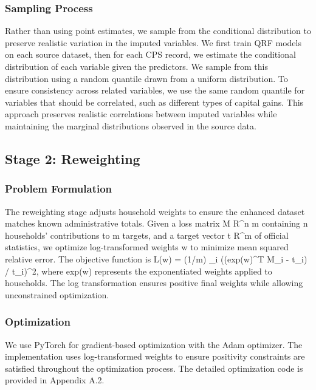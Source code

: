 \subsubsection{Sampling Process}

Rather than using point estimates, we sample from the conditional distribution to preserve realistic variation in the imputed variables. We first train QRF models on each source dataset, then for each CPS record, we estimate the conditional distribution of each variable given the predictors. We sample from this distribution using a random quantile drawn from a uniform distribution. To ensure consistency across related variables, we use the same random quantile for variables that should be correlated, such as different types of capital gains. This approach preserves realistic correlations between imputed variables while maintaining the marginal distributions observed in the source data.

\subsection{Stage 2: Reweighting}

\subsubsection{Problem Formulation}

The reweighting stage adjusts household weights to ensure the enhanced dataset matches known administrative totals. Given a loss matrix M  \in  R^{n \times m} containing n households' contributions to m targets, and a target vector t  \in  R^m of official statistics, we optimize log-transformed weights w to minimize mean squared relative error. The objective function is L(w) = (1/m) \Sigma\_i ((exp(w)^T M\_i - t\_i) / t\_i)^2, where exp(w) represents the exponentiated weights applied to households. The log transformation ensures positive final weights while allowing unconstrained optimization.

\subsubsection{Optimization}

We use PyTorch for gradient-based optimization with the Adam optimizer. The implementation uses log-transformed weights to ensure positivity constraints are satisfied throughout the optimization process. The detailed optimization code is provided in Appendix A.2.

